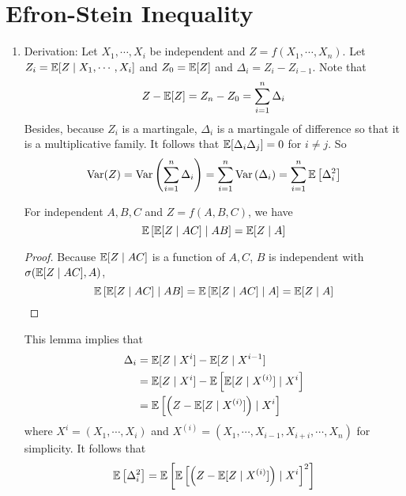 \section{Efron-Stein Inequality}
\begin{enumerate}[label=\arabic{*}.]
	\item Derivation: Let $X_1,\cdots,X_i$ be independent and $Z = f(X_1,\cdots,X_n)$. Let $Z_i = \mathbb{E}[Z \mid X_1,\cdots,X_i]$ and $Z_0 = \mathbb{E}[Z]$ and $\Delta_i = Z_i - Z_{i-1}$. Note that
	\begin{equation*}
	    Z - \mathbb{E}[Z] = Z_n - Z_0 = \sum_{i=1}^n\Delta_i
	\end{equation*}
	Besides, because $Z_i$ is a martingale, $\Delta_i$ is a martingale of difference so that it is a multiplicative family. It follows that $\mathbb{E}[\Delta_i\Delta_j] = 0$ for $i \neq j$. So
	\begin{equation*}
	    \operatorname{Var}(Z) = \operatorname{Var}\left(\sum_{i=1}^n\Delta_i\right) = \sum_{i=1}^n\operatorname{Var}\left(\Delta_i\right) = \sum_{i=1}^n\mathbb{E}\left[\Delta_i^2\right]
	\end{equation*}
	\begin{lem}
	    For independent $A,B,C$ and $Z = f(A,B,C)$, we have
	    \begin{equation*}
	        \mathbb{E}\left[\mathbb{E}[Z \mid AC] \mid AB\right] = \mathbb{E}[Z \mid A]
	    \end{equation*}
	\end{lem}
	\begin{proof}
	    Because $\mathbb{E}[Z \mid AC]$ is a function of $A,C$, $B$ is independent with $\sigma(\mathbb{E}[Z \mid AC],A)$,
	    \begin{equation*}
	        \mathbb{E}\left[\mathbb{E}[Z \mid AC] \mid AB\right] =\mathbb{E}\left[\mathbb{E}[Z \mid AC] \mid A\right] =\mathbb{E}[Z \mid A] \qedhere
	    \end{equation*}
	\end{proof}
	This lemma implies that
	\begin{equation*}
	    \begin{aligned}
	    	\Delta_i &= \mathbb{E}[Z \mid X^i] - \mathbb{E}[Z \mid X^{i-1}] \\
	    	&= \mathbb{E}[Z \mid X^i] - \mathbb{E}\left[\mathbb{E}[Z \mid X^{(i)}] \mid X^i\right] \\
	    	&= \mathbb{E}\left[\left(Z - \mathbb{E}[Z \mid X^{(i)}]\right) \mid X^i\right] 
	    \end{aligned}
	\end{equation*}
	where $X^i = (X_1,\cdots,X_i)$ and $X^{(i)} = (X_1,\cdots,X_{i-1},X_{i+i},\cdots,X_n)$ for simplicity. It follows that
	\begin{equation*}
	    \begin{aligned}
	    	\E\bj{\Delta_i^2} &= \E\bj{\E\bj{\bc{Z - \E[Z \mid X^{(i)}]} \mid X^i}^2} \\

\end{aligned}
\end{equation*}
\end{enumerate}
